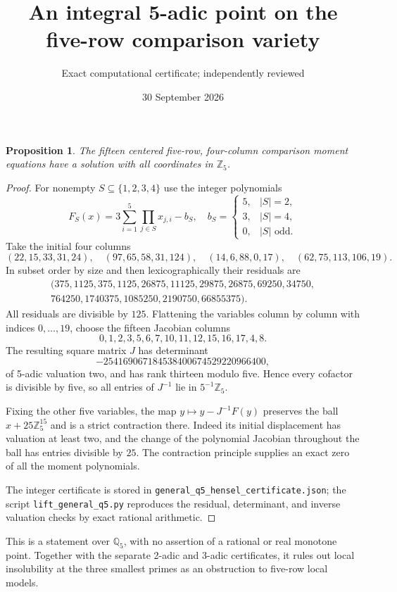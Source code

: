 \documentclass[11pt]{article}
\title{An integral 5-adic point on the five-row comparison variety}
\author{Exact computational certificate; independently reviewed}
\date{30 September 2026}
\newtheorem{proposition}{Proposition}
\begin{document}
\maketitle
\begin{proposition}
The fifteen centered five-row, four-column comparison moment
equations have a solution with all coordinates in $\mathbb Z_5$.
\end{proposition}
\begin{proof}
For nonempty $S\subseteq\{1,2,3,4\}$ use the integer polynomials
\[
 F_S(x)=3\sum_{i=1}^5\prod_{j\in S}x_{j,i}-b_S,
 \quad b_S=\begin{cases}5,&|S|=2,\\3,&|S|=4,\\0,&|S|\text{ odd}.\end{cases}
\]
Take the initial four columns
\[
 (22,15,33,31,24),\quad (97,65,58,31,124),
 \quad(14,6,88,0,17),\quad(62,75,113,106,19).
\]
In subset order by size and then lexicographically their residuals are
\[
\begin{split}
(375,1125,375,1125,26875,11125,29875,26875,69250,34750,\\
764250,1740375,1085250,2190750,66855375).
\end{split}
\]
All residuals are divisible by $125$. Flattening the variables
column by column with indices $0,\ldots,19$, choose the fifteen
Jacobian columns
\[
0,1,2,3,5,6,7,10,11,12,15,16,17,4,8.
\]
The resulting square matrix $J$ has determinant
\[
 -254169067184538400674529220966400,
\]
of 5-adic valuation two, and has rank thirteen modulo five. Hence
every cofactor is divisible by five, so all entries of $J^{-1}$ lie
in $5^{-1}\mathbb Z_5$.

Fixing the other five variables, the map $y\mapsto y-J^{-1}F(y)$
preserves the ball $x+25\mathbb Z_5^{15}$ and is a strict contraction
there. Indeed its initial displacement has valuation at least two,
and the change of the polynomial Jacobian throughout the ball has
entries divisible by $25$. The contraction principle supplies an
exact zero of all the moment polynomials.

The integer certificate is stored in
\texttt{general\_q5\_hensel\_certificate.json}; the script
\texttt{lift\_general\_q5.py} reproduces the residual, determinant,
and inverse valuation checks by exact rational arithmetic.
\end{proof}
This is a statement over $\mathbb Q_5$, with no assertion of a
rational or real monotone point. Together with the separate 2-adic
and 3-adic certificates, it rules out local insolubility at the three
smallest primes as an obstruction to five-row local models.
\end{document}
